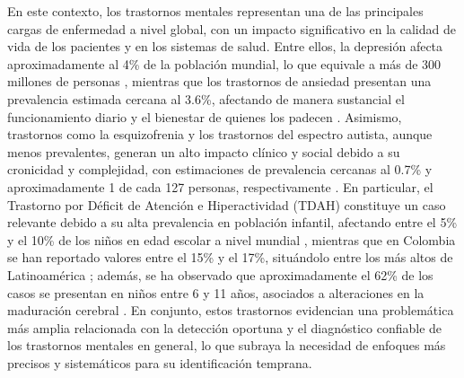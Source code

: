 

En este contexto, los trastornos mentales representan una de las principales cargas de enfermedad a nivel global, con un impacto significativo en la calidad de vida de los pacientes y en los sistemas de salud. Entre ellos, la depresión afecta aproximadamente al 4\% de la población mundial, lo que equivale a más de 300 millones de personas \cite{WHO2023Depression}, mientras que los trastornos de ansiedad presentan una prevalencia estimada cercana al 3.6\%, afectando de manera sustancial el funcionamiento diario y el bienestar de quienes los padecen \cite{GBD2017Mental}. Asimismo, trastornos como la esquizofrenia y los trastornos del espectro autista, aunque menos prevalentes, generan un alto impacto clínico y social debido a su cronicidad y complejidad, con estimaciones de prevalencia cercanas al 0.7\% \cite{McGrath2008} y aproximadamente 1 de cada 127 personas, respectivamente \cite{WHO2022Autism}. En particular, el Trastorno por Déficit de Atención e Hiperactividad (TDAH) constituye un caso relevante debido a su alta prevalencia en población infantil, afectando entre el 5\% y el 10\% de los niños en edad escolar a nivel mundial \cite{GalianaSimal2020}, mientras que en Colombia se han reportado valores entre el 15\% y el 17\%, situándolo entre los más altos de Latinoamérica \cite{Pineda2003}; además, se ha observado que aproximadamente el 62\% de los casos se presentan en niños entre 6 y 11 años, asociados a alteraciones en la maduración cerebral \cite{LlanosLizcano2019}. En conjunto, estos trastornos evidencian una problemática más amplia relacionada con la detección oportuna y el diagnóstico confiable de los trastornos mentales en general, lo que subraya la necesidad de enfoques más precisos y sistemáticos para su identificación temprana.


